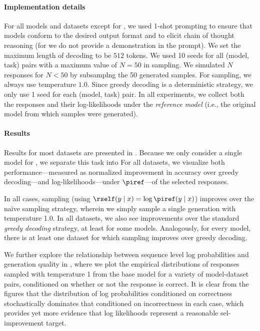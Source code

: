 {\paragraph{Implementation details}
For all models and datasets except for \gametwentyfour, we used 1-shot prompting to ensure that models conform to the desired output format and to elicit chain of thought reasoning (for \gametwentyfour we do not provide a demonstration in the prompt). We set the maximum length of decoding to be $512$ tokens. We used 10 seeds for all (model, task) pairs with a maximum value of $N=50$ in \BestofN sampling. We simulated $N$ responses for $N<50$ by subsamplng the 50 generated samples. For \BestofN sampling, we always use temperature $1.0$. Since greedy decoding is a deterministic strategy, we only use 1 seed for each (model, task) pair. In all experiments, we collect both the responses and their log-likelihoods under the \emph{reference model} (i.e., the original model from which samples were generated). 

\paragraph{Results}
Results for most datasets are presented in .  Because we only consider a single model for \gametwentyfour, we separate this task into  For all datasets, we visualize both performance---measured as normalized improvement in accuracy over greedy decoding---and log-likelihoods---under $\piref$---of the selected responses. 

In all cases, \BestofN sampling (using $\rself(y\mid{}x)=\log\piref(y\mid{}x)$) improves over the na{\"i}ve sampling strategy, wherein we simply sample a single generation with temperature 1.0.  In all datasets, we also see improvements over the standard \emph{greedy decoding} strategy, at least for some models. 
Analogously, for every model, there is at least one dataset for which \BestofN sampling improves over greedy decoding. 

We further explore the relationship between sequence level log probabilities and generation quality in , where we plot the empirical distributions of responses sampled with temperature 1 from the base model for a variety of model-dataset pairs, conditioned on whether or not the response is correct.  It is clear from the figures that the distribution of log probabilities conditioned on correctness stochastically dominates that conditioned on incorrectness in each case, which provides yet more evidence that log likelihoods represent a reasonable sel-improvement target.

}
